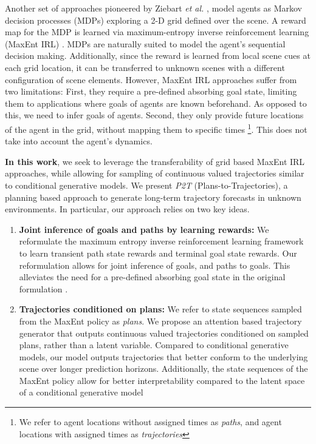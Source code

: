 \documentclass[journal]{IEEEtran}
\begin{document}
Another set of approaches \cite{ziebart2009planning, kitani2012activity, wulfmeier2016watch, zhang2018integrating} pioneered by Ziebart \textit{et al.} \cite{ziebart2009planning}, model agents as Markov decision processes (MDPs) exploring a 2-D grid defined over the scene. A reward map for the MDP is learned via maximum-entropy inverse reinforcement learning (MaxEnt IRL) \cite{ziebart2008maximum}. MDPs are naturally suited to model the agent's sequential decision making. Additionally, since the reward is learned from local scene cues at each grid location, it can be transferred to unknown scenes with a different configuration of scene elements. However, MaxEnt IRL approaches suffer from two limitations: First,
they require a pre-defined absorbing goal state, limiting them to applications where goals of agents are known beforehand. As opposed to this, we need to infer goals of agents. Second, they only provide future locations of the agent in the grid, without mapping them to specific times \footnote{We refer to agent locations without assigned times as \textit{paths}, and agent
locations with assigned times as \textit{trajectories}}. This does not take into account the agent's dynamics. 









\textbf{In this work}, we seek to leverage the transferability of grid based MaxEnt IRL approaches, while allowing for sampling of continuous valued trajectories similar to conditional generative models. We present \textit{P2T} (Plans-to-Trajectories), a planning based approach to generate long-term trajectory forecasts in unknown environments. In particular, our approach relies on two key ideas.  
\begin{enumerate}
\item \textbf{Joint inference of goals and paths by learning rewards:} We reformulate the maximum entropy inverse reinforcement learning framework to learn transient path state rewards and terminal goal state rewards. Our reformulation allows for joint inference of goals, and paths to goals. This alleviates the need for a pre-defined absorbing goal state in the original formulation \cite{ziebart2008maximum}. 
\item \textbf{Trajectories conditioned on plans:} We refer to state sequences sampled from the MaxEnt policy as \textit{plans}. We propose an attention based trajectory generator that outputs continuous valued trajectories conditioned on sampled plans, rather than a latent variable.  Compared to conditional generative models, our model outputs trajectories that better conform to the underlying scene over longer prediction horizons. Additionally, the state sequences of the MaxEnt policy allow for better interpretability compared to the latent space of a conditional generative model
\end{enumerate}
\end{document}
